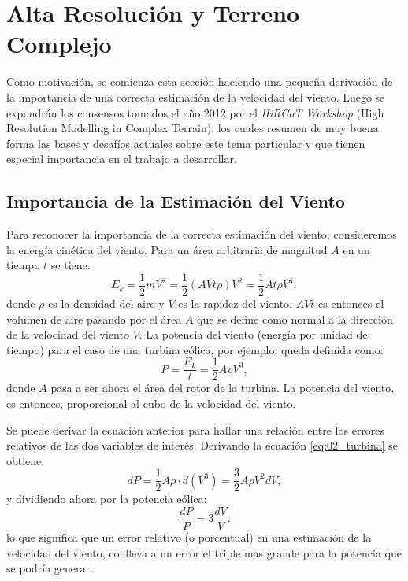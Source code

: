 \section{Alta Resolución y Terreno Complejo}
Como motivación, se comienza esta sección haciendo una pequeña derivación de la importancia de una correcta estimación de la velocidad del viento. Luego se expondrán los consensos tomados el año 2012 por el \emph{HiRCoT Workshop} (High Resolution Modelling in Complex Terrain), los cuales resumen de muy buena forma las bases y desafíos actuales sobre este tema particular y que tienen especial importancia en el trabajo a desarrollar.
\subsection{Importancia de la Estimación del Viento}
Para reconocer la importancia de la correcta estimación del viento, consideremos la energía cinética del viento. Para un área arbitraria de magnitud $A$ en un tiempo $t$ se tiene:
\begin{equation} 
E_k = \frac{1}{2}mV^2 = \frac{1}{2}(AVt\rho)V^2 = \frac{1}{2}At\rho V^3,
\end{equation}
donde $\rho$ es la densidad del aire y $V$ es la rapidez del viento. $AVt$ es entonces el volumen de aire pasando por el área $A$ que se define como normal a la dirección de la velocidad del viento $V$. La potencia del viento (energía por unidad de tiempo) para el caso de una turbina eólica, por ejemplo, queda definida como:
\begin{equation}\label{eq:02_turbina}
P = \frac{E_k}{t} = \frac{1}{2}A\rho V^3,
\end{equation}
donde $A$ pasa a ser ahora el área del rotor de la turbina. La potencia del viento, es entonces, proporcional al cubo de la velocidad del viento.

Se puede derivar la ecuación anterior para hallar una relación entre los errores relativos de las dos variables de interés. Derivando la ecuación \ref{eq:02_turbina} se obtiene:
\begin{equation}
dP = \frac{1}{2}A\rho\cdot d(V^3) = \frac{3}{2}A\rho V^2 dV,
\end{equation}
y dividiendo ahora por la potencia eólica:
\begin{equation}
\frac{dP}{P} = 3\frac{dV}{V}.
\end{equation}
lo que significa que un error relativo (o porcentual) en una estimación de la velocidad del viento, conlleva a un error el triple mas grande para la potencia que se podría generar.


